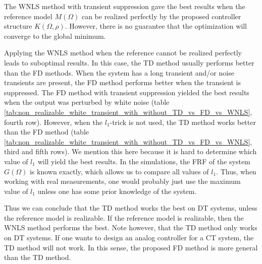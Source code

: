 The WNLS method with transient suppression gave the best results when the reference model $M(\Omega)$ can be realized perfectly by the proposed controller structure $K(\Omega,\rho)$. However, there is no guarantee that the optimization will converge to the global minimum. 

Applying the WNLS method when the reference cannot be realized perfectly leads to suboptimal results. In this case, the TD method usually performs better than the FD methods. When the system has a long transient and/or noise transients are present, the FD method performs better when the transient is suppressed. The FD method with transient suppression yielded the best results when the output was perturbed by white noise (table \ref{tab:non_realizable_white_transient_with_without_TD_vs_FD_vs_WNLS}, fourth row). However, when the $l_1$-trick is not used, the TD method works better than the FD method (table \ref{tab:non_realizable_white_transient_with_without_TD_vs_FD_vs_WNLS}, third and fifth rows). We mention this here because it is hard to determine which value of $l_1$ will yield the best results. In the simulations, the FRF of the system $G(\Omega)$ is known exactly, which allows us to compare all values of $l_1$. Thus, when working with real measurements, one would probably just use the maximum value of $l_1$ unless one has some prior knowledge of the system.

Thus we can conclude that the TD method works the best on DT systems, unless the reference model is realizable. If the reference model is realizable, then the WNLS method performs the best. Note however, that the TD method only works on DT systems. If one wants to design an analog controller for a CT system, the TD method will not work. In this sense, the proposed FD method is more general than the TD method.
